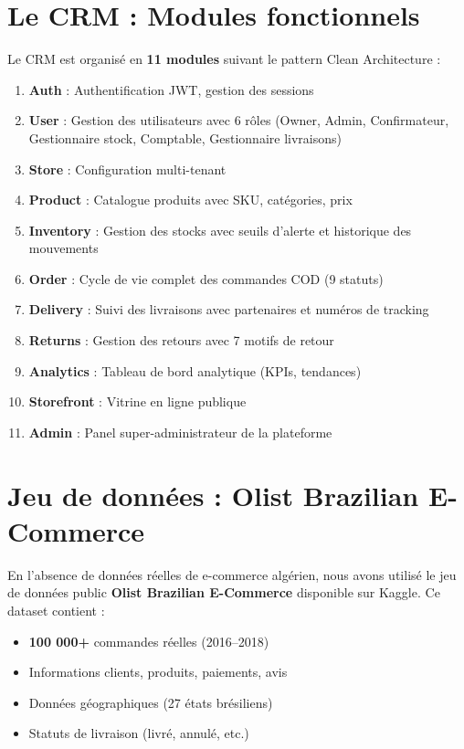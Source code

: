 \documentclass[12pt,a4paper]{report}
\begin{document}
\section{Le CRM : Modules fonctionnels}

Le CRM est organis\'{e} en \textbf{11 modules} suivant le pattern Clean Architecture :

\begin{enumerate}
  \item \textbf{Auth} : Authentification JWT, gestion des sessions
  \item \textbf{User} : Gestion des utilisateurs avec 6 r\^{o}les (Owner, Admin, Confirmateur, Gestionnaire stock, Comptable, Gestionnaire livraisons)
  \item \textbf{Store} : Configuration multi-tenant
  \item \textbf{Product} : Catalogue produits avec SKU, cat\'{e}gories, prix
  \item \textbf{Inventory} : Gestion des stocks avec seuils d'alerte et historique des mouvements
  \item \textbf{Order} : Cycle de vie complet des commandes COD (9 statuts)
  \item \textbf{Delivery} : Suivi des livraisons avec partenaires et num\'{e}ros de tracking
  \item \textbf{Returns} : Gestion des retours avec 7 motifs de retour
  \item \textbf{Analytics} : Tableau de bord analytique (KPIs, tendances)
  \item \textbf{Storefront} : Vitrine en ligne publique
  \item \textbf{Admin} : Panel super-administrateur de la plateforme
\end{enumerate}

\section{Jeu de donn\'{e}es : Olist Brazilian E-Commerce}

En l'absence de donn\'{e}es r\'{e}elles de e-commerce alg\'{e}rien, nous avons utilis\'{e} le jeu de donn\'{e}es public \textbf{Olist Brazilian E-Commerce} \cite{olist2018} disponible sur Kaggle. Ce dataset contient :

\begin{itemize}
  \item \textbf{100 000+} commandes r\'{e}elles (2016--2018)
  \item Informations clients, produits, paiements, avis
  \item Donn\'{e}es g\'{e}ographiques (27 \'{e}tats br\'{e}siliens)
  \item Statuts de livraison (livr\'{e}, annul\'{e}, etc.)
\end{itemize}
\end{document}
